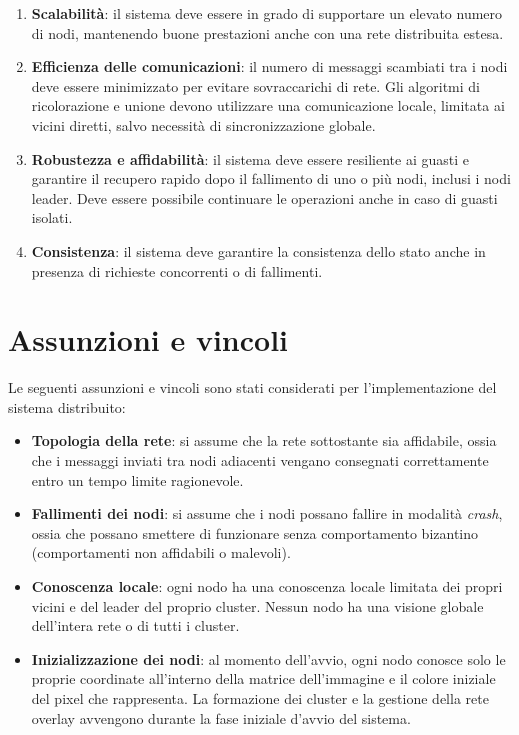 \documentclass[12pt, a4paper]{report}
\begin{document}
\begin{enumerate}
    \item \textbf{Scalabilit\`a}: il sistema deve essere in grado di supportare un elevato numero di nodi, mantenendo buone prestazioni anche con una rete distribuita estesa.

    \item \textbf{Efficienza delle comunicazioni}: il numero di messaggi scambiati tra i nodi deve essere minimizzato per evitare sovraccarichi di rete. Gli algoritmi di ricolorazione e unione devono utilizzare una comunicazione locale, limitata ai vicini diretti, salvo necessit\`a di sincronizzazione globale.

    \item \textbf{Robustezza e affidabilit\`a}: il sistema deve essere resiliente ai guasti e garantire il recupero rapido dopo il fallimento di uno o pi\`u nodi, inclusi i nodi leader. Deve essere possibile continuare le operazioni anche in caso di guasti isolati.

    \item \textbf{Consistenza}: il sistema deve garantire la consistenza dello stato anche in presenza di richieste concorrenti o di fallimenti.

\end{enumerate}

\section{Assunzioni e vincoli}

Le seguenti assunzioni e vincoli sono stati considerati per l'implementazione del sistema distribuito:

\begin{itemize}
    \item \textbf{Topologia della rete}: si assume che la rete sottostante sia affidabile, ossia che i messaggi inviati tra nodi adiacenti vengano consegnati correttamente entro un tempo limite ragionevole.

    \item \textbf{Fallimenti dei nodi}: si assume che i nodi possano fallire in modalit\`a \emph{crash}, ossia che possano smettere di funzionare senza comportamento bizantino (comportamenti non affidabili o malevoli).

    \item \textbf{Conoscenza locale}: ogni nodo ha una conoscenza locale limitata dei propri vicini e del leader del proprio cluster. Nessun nodo ha una visione globale dell'intera rete o di tutti i cluster.

    \item \textbf{Inizializzazione dei nodi}: al momento dell'avvio, ogni nodo conosce solo le proprie coordinate all'interno della matrice dell'immagine e il colore iniziale del pixel che rappresenta. La formazione dei cluster e la gestione della rete overlay avvengono durante la fase iniziale d'avvio del sistema.

\end{itemize}
\end{document}
